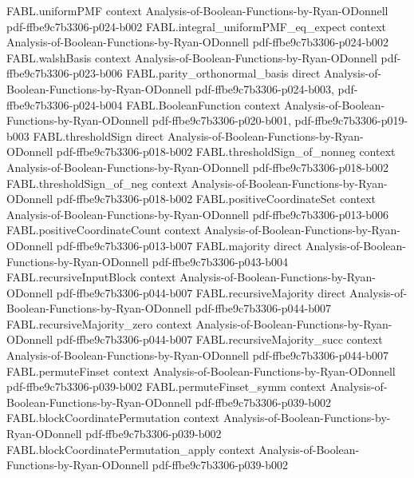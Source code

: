 \begin{theorem}
  {FABL.uniformPMF}
  {context}
  {Analysis-of-Boolean-Functions-by-Ryan-ODonnell}
  {pdf-ffbe9c7b3306-p024-b002}
\proofstep
  {FABL.integral_uniformPMF_eq_expect}
  {context}
  {Analysis-of-Boolean-Functions-by-Ryan-ODonnell}
  {pdf-ffbe9c7b3306-p024-b002}
\proofstep
  {FABL.walshBasis}
  {context}
  {Analysis-of-Boolean-Functions-by-Ryan-ODonnell}
  {pdf-ffbe9c7b3306-p023-b006}
\proofstep
  {FABL.parity_orthonormal_basis}
  {direct}
  {Analysis-of-Boolean-Functions-by-Ryan-ODonnell}
  {pdf-ffbe9c7b3306-p024-b003,
    pdf-ffbe9c7b3306-p024-b004}
\proofstep
  {FABL.BooleanFunction}
  {context}
  {Analysis-of-Boolean-Functions-by-Ryan-ODonnell}
  {pdf-ffbe9c7b3306-p020-b001,
    pdf-ffbe9c7b3306-p019-b003}
\proofstep
  {FABL.thresholdSign}
  {direct}
  {Analysis-of-Boolean-Functions-by-Ryan-ODonnell}
  {pdf-ffbe9c7b3306-p018-b002}
\proofstep
  {FABL.thresholdSign_of_nonneg}
  {context}
  {Analysis-of-Boolean-Functions-by-Ryan-ODonnell}
  {pdf-ffbe9c7b3306-p018-b002}
\proofstep
  {FABL.thresholdSign_of_neg}
  {context}
  {Analysis-of-Boolean-Functions-by-Ryan-ODonnell}
  {pdf-ffbe9c7b3306-p018-b002}
\proofstep
  {FABL.positiveCoordinateSet}
  {context}
  {Analysis-of-Boolean-Functions-by-Ryan-ODonnell}
  {pdf-ffbe9c7b3306-p013-b006}
\proofstep
  {FABL.positiveCoordinateCount}
  {context}
  {Analysis-of-Boolean-Functions-by-Ryan-ODonnell}
  {pdf-ffbe9c7b3306-p013-b007}
\proofstep
  {FABL.majority}
  {direct}
  {Analysis-of-Boolean-Functions-by-Ryan-ODonnell}
  {pdf-ffbe9c7b3306-p043-b004}
\proofstep
  {FABL.recursiveInputBlock}
  {context}
  {Analysis-of-Boolean-Functions-by-Ryan-ODonnell}
  {pdf-ffbe9c7b3306-p044-b007}
\proofstep
  {FABL.recursiveMajority}
  {direct}
  {Analysis-of-Boolean-Functions-by-Ryan-ODonnell}
  {pdf-ffbe9c7b3306-p044-b007}
\proofstep
  {FABL.recursiveMajority_zero}
  {context}
  {Analysis-of-Boolean-Functions-by-Ryan-ODonnell}
  {pdf-ffbe9c7b3306-p044-b007}
\proofstep
  {FABL.recursiveMajority_succ}
  {context}
  {Analysis-of-Boolean-Functions-by-Ryan-ODonnell}
  {pdf-ffbe9c7b3306-p044-b007}
\proofstep
  {FABL.permuteFinset}
  {context}
  {Analysis-of-Boolean-Functions-by-Ryan-ODonnell}
  {pdf-ffbe9c7b3306-p039-b002}
\proofstep
  {FABL.permuteFinset_symm}
  {context}
  {Analysis-of-Boolean-Functions-by-Ryan-ODonnell}
  {pdf-ffbe9c7b3306-p039-b002}
\proofstep
  {FABL.blockCoordinatePermutation}
  {context}
  {Analysis-of-Boolean-Functions-by-Ryan-ODonnell}
  {pdf-ffbe9c7b3306-p039-b002}
\proofstep
  {FABL.blockCoordinatePermutation_apply}
  {context}
  {Analysis-of-Boolean-Functions-by-Ryan-ODonnell}
  {pdf-ffbe9c7b3306-p039-b002}
\proofstep

\end{theorem}
